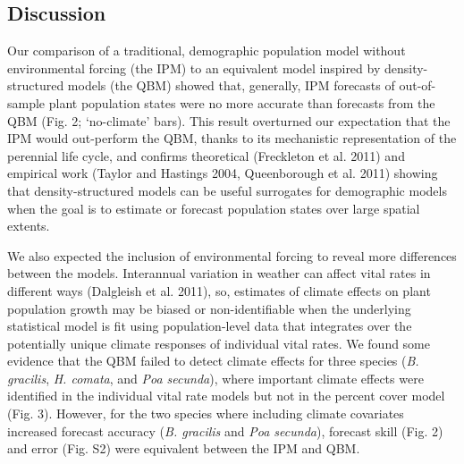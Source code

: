 \documentclass[12pt,]{article}
\begin{document}
\subsection{Discussion}\label{discussion}

Our comparison of a traditional, demographic population model without
environmental forcing (the IPM) to an equivalent model inspired by
density-structured models (the QBM) showed that, generally, IPM
forecasts of out-of-sample plant population states were no more accurate
than forecasts from the QBM (Fig. 2; `no-climate' bars). This result
overturned our expectation that the IPM would out-perform the QBM,
thanks to its mechanistic representation of the perennial life cycle,
and confirms theoretical (Freckleton et al. 2011) and empirical work
(Taylor and Hastings 2004, Queenborough et al. 2011) showing that
density-structured models can be useful surrogates for demographic
models when the goal is to estimate or forecast population states over
large spatial extents.

We also expected the inclusion of environmental forcing to reveal more
differences between the models. Interannual variation in weather can
affect vital rates in different ways (Dalgleish et al. 2011), so,
estimates of climate effects on plant population growth may be biased or
non-identifiable when the underlying statistical model is fit using
population-level data that integrates over the potentially unique
climate responses of individual vital rates. We found some evidence that
the QBM failed to detect climate effects for three species (\emph{B.
gracilis}, \emph{H. comata}, and \emph{Poa secunda}), where important
climate effects were identified in the individual vital rate models but
not in the percent cover model (Fig. 3). However, for the two species
where including climate covariates increased forecast accuracy (\emph{B.
gracilis} and \emph{Poa secunda}), forecast skill (Fig. 2) and error
(Fig. S2) were equivalent between the IPM and QBM.
\end{document}
